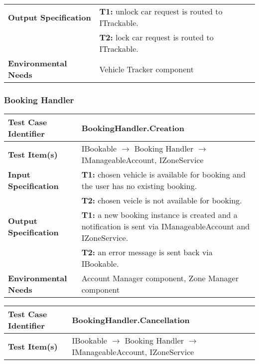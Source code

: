 {\begin{tabularx}{\textwidth}{l X}
    \textbf{Output Specification} & \textbf{T1:} unlock car request is routed to ITrackable. \\
                                & \textbf{T2:} lock car request is routed to ITrackable. \\
    \hline 
    
    \textbf{Environmental Needs} & Vehicle Tracker component\\
    \hline
\end{tabularx}

\subsubsection{Booking Handler}
\begin{tabularx}{\textwidth}{l X}
    \hline 
    \textbf{Test Case Identifier} & BookingHandler.Creation\\ 
    \hline 
    
    \textbf{Test Item(s)} & IBookable $\rightarrow$ Booking Handler $\rightarrow$ IManageableAccount, IZoneService\\
    \hline 
    
    \textbf{Input Specification} & \textbf{T1:} chosen vehicle is available for booking and the user has no existing booking. \\
                                & \textbf{T2:} chosen veicle is not available for booking. \\
    \hline 
    
    \textbf{Output Specification} & \textbf{T1:} a new booking instance is created and a notification is sent via IManageableAccount and IZoneService.\\
                                & \textbf{T2:} an error message is sent back via IBookable.\\
    \hline 
    
    \textbf{Environmental Needs} & Account Manager component, Zone Manager component\\
    \hline
\end{tabularx}
\bigskip 

\noindent
\begin{tabularx}{\textwidth}{l X}
    \hline 
    \textbf{Test Case Identifier} & BookingHandler.Cancellation\\ 
    \hline 
    
    \textbf{Test Item(s)} & IBookable $\rightarrow$ Booking Handler $\rightarrow$ IManageableAccount, IZoneService\\
    \hline 
    

\end{tabularx}}
